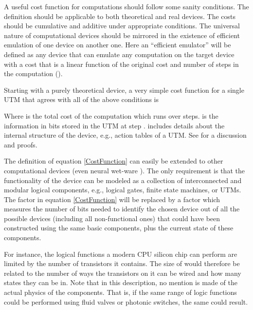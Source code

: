 \documentclass{article}
\begin{document}
A useful cost function for computations should follow some sanity conditions.
The definition should be applicable to both theoretical and real devices. The costs
should be cumulative and additive under appropriate conditions. The universal nature of 
computational devices should be mirrored in the existence of efficient emulation of one 
device on another one. Here an ``efficient emulator'' will be defined as any device that 
can emulate any computation on the target device with a cost that is a linear function 
of the original cost and number of steps in the computation (\cite{Son0911-5262}).

Starting with a purely theoretical device, a very simple cost function for a single 
UTM that agrees with all of the above conditions is

Where  is the total cost of the computation which runs over  steps.
 is the information in bits stored in the UTM at step
.  includes details about the internal structure 
of the device, e.g., action tables of a UTM. See \cite{Son0911-5262} 
for a discussion and proofs.

The definition of equation \ref{CostFunction} can easily be extended to other
computational devices (even neural wet-ware \cite{Son0911-5262}).
The only requirement is that the functionality of the device can be modeled
as a collection of interconnected and modular logical components, e.g., 
logical gates, finite state machines, or UTMs. The factor  
in equation \ref{CostFunction} will
be replaced by a factor  which measures the number of bits
needed to identify the chosen device out of all the possible devices
(including all non-functional ones) that could have been constructed 
using the same basic components, 
plus the current state of these components.

For instance, the logical functions a modern CPU silicon chip can
perform are limited by the number of transistors it contains. The
size of  would therefore be related to the number of ways
the transistors on it can be wired and how many states they can be in.
Note that in this description, no mention is made of the actual
physics of the components. That is, if the same range of logic 
functions could be performed using fluid valves or photonic 
switches, the same  could result.
\end{document}
